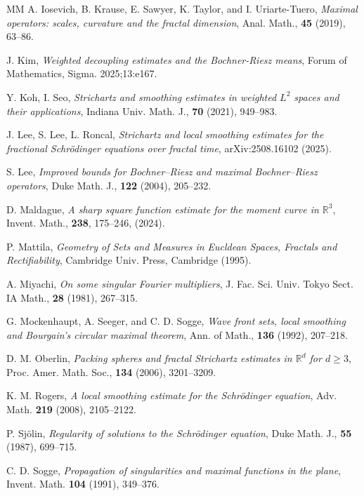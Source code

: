\documentclass[11pt]{amsart}
\theoremstyle{definition}
\theoremstyle{remark}
\newcommand{\R}{\mathbb{R}}
\begin{document}
\begin{thebibliography}{MM}
 A. Iosevich, B. Krause, E. Sawyer, K. Taylor, and I. Uriarte-Tuero,
\textit{Maximal operators: scales, curvature and the fractal dimension},
Anal. Math., \textbf{45} (2019), 63--86.

 J. Kim,
\textit{Weighted decoupling estimates and the Bochner-Riesz means},
Forum of Mathematics, Sigma. 2025;13:e167.

 Y. Koh, I. Seo,
\textit{Strichartz and smoothing estimates in weighted $L^2$ spaces and their applications},
Indiana Univ. Math. J., \textbf{70} (2021), 949--983.

 J. Lee, S. Lee, L. Roncal,
\textit{Strichartz and local smoothing estimates for the fractional Schr\"odinger equations over fractal time},
arXiv:2508.16102 (2025).

 S. Lee, 
\textit{Improved bounds for Bochner–Riesz and maximal Bochner–Riesz operators},
Duke Math. J., \textbf{122} (2004), 205--232.

 D. Maldague,
\textit{A sharp square function estimate for the moment curve in $\R^3$},
Invent. Math., \textbf{238}, 175--246, (2024).

 P. Mattila,
\textit{Geometry of Sets and Measures in Eucldean Spaces, Fractals and Rectifiability},
Cambridge Univ. Press, Cambridge (1995).

 A. Miyachi,
\textit{On some singular Fourier multipliers},
J. Fac. Sci. Univ. Tokyo Sect. IA Math., \textbf{28} (1981), 267--315.

 G. Mockenhaupt, A. Seeger, and C. D. Sogge, 
\textit{Wave front sets, local smoothing and Bourgain's circular maximal theorem},
Ann. of Math., \textbf{136} (1992), 207--218.

 D. M. Oberlin,
\textit{Packing spheres and fractal Strichartz estimates in $\R^d$ for $d\ge3$},
Proc. Amer. Math. Soc., \textbf{134} (2006), 3201--3209.

 K. M. Rogers,
\textit{A local smoothing estimate for the Schr\"odinger equation}, 
Adv. Math. \textbf{219} (2008), 2105--2122.

 P. Sj\"olin, 
\textit{Regularity of solutions to the Schr\"odinger equation}, Duke Math. J., \textbf{55} (1987), 699--715.

 C. D. Sogge, 
\textit{Propagation of singularities and maximal functions in the plane}, 
Invent. Math. \textbf{104} (1991), 349--376.


\end{thebibliography}
\end{document}
